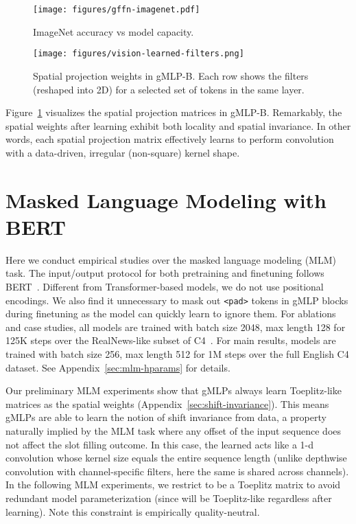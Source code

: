 \documentclass{article}
\newcommand{\gffn}{gMLP\xspace}
\begin{document}
\begin{figure}[h]
    \begin{minipage}{0.51\linewidth}
        \centering
        \texttt{[image: figures/gffn-imagenet.pdf]}
        \caption{ImageNet accuracy vs model capacity.}
        \label{fig:vision-main}
    \end{minipage}
    \hfill
    \begin{minipage}{0.475\linewidth}
        \centering
        \texttt{[image: figures/vision-learned-filters.png]}
    \caption{
    Spatial projection weights in gMLP-B.
    Each row shows the filters (reshaped into 2D) for a selected set of tokens in the same layer.}
    \label{fig:vision-filters}
    \end{minipage}
\end{figure}


Figure~\ref{fig:vision-filters} visualizes the spatial projection matrices in \gffn-B.
Remarkably,
the spatial weights after learning exhibit both locality and spatial invariance.
In other words,
each spatial projection matrix effectively learns to perform convolution with a data-driven, irregular (non-square) kernel shape.

\section{Masked Language Modeling with BERT}
\label{sec:mlm}
Here we conduct empirical studies over the masked language modeling (MLM) task. The input/output protocol for both pretraining and finetuning follows BERT~\cite{devlin2018bert}. 
Different from Transformer-based models, we do not use positional encodings. We also find it unnecessary to mask out \texttt{<pad>} tokens in \gffn blocks during finetuning as the model can quickly learn to ignore them.
For ablations and case studies,
all models are trained with batch size 2048, max length 128 for 125K steps over the RealNews-like subset of C4~\cite{raffel2019exploring}.
For main results, models are trained with batch size 256, max length 512 for 1M steps over the full English C4 dataset.
See Appendix~\ref{sec:mlm-hparams} for details.

Our preliminary MLM experiments show that gMLPs always learn Toeplitz-like matrices as the spatial weights (Appendix~\ref{sec:shift-invariance}).
This means gMLPs are able to learn the notion of shift invariance from data, a property naturally implied by the MLM task where any offset of the input sequence does not affect the slot filling outcome.
In this case,
the learned  acts like a 1-d convolution whose kernel size equals the entire sequence length (unlike depthwise convolution with channel-specific filters, here the same  is shared across channels).
In the following MLM experiments,
we restrict  to be a Toeplitz matrix to avoid redundant model parameterization (since  will be Toeplitz-like regardless after learning).
Note this constraint is empirically quality-neutral.
\end{document}
